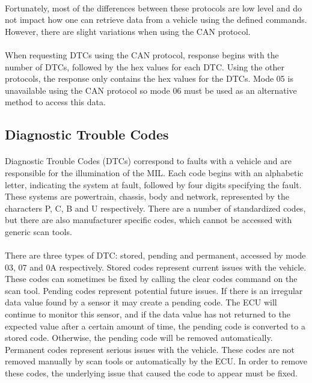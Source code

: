 {		\paragraph{}{
		Fortunately, most of the differences between these protocols are low level and do not impact how one can retrieve data from a vehicle using the defined commands. However, there are slight variations when using the CAN protocol.
		}
		\paragraph{}{
		 When requesting DTCs using the CAN protocol, response begins with the number of DTCs, followed by the hex values for each DTC. Using the other protocols, the response only contains the hex values for the DTCs. Mode 05 is unavailable using the CAN protocol so mode 06 must be used as an alternative method to access this data.
		}	
	}
	\subsection{Diagnostic Trouble Codes}{
		\paragraph{}{
		Diagnostic Trouble Codes (DTCs) correspond to faults with a vehicle and are responsible for the illumination of the MIL. Each code begins with an alphabetic letter, indicating the system at fault, followed by four digits specifying the fault. These systems are powertrain, chassis, body and network, represented by the characters P, C, B and U respectively. There are a number of standardized codes, but there are also manufacturer specific codes, which cannot be accessed with generic scan tools.
		}
		\paragraph{}{
		There are three types of DTC: stored, pending and permanent, accessed by mode 03, 07 and 0A respectively. Stored codes represent current issues with the vehicle. These codes can sometimes be fixed by calling the clear codes command on the scan tool. Pending codes represent potential future issues. If there is an irregular data value found by a sensor it may create a pending code. The ECU will continue to monitor this sensor, and if the data value has not returned to the expected value after a certain amount of time, the pending code is converted to a stored code. Otherwise, the pending code will be removed automatically. Permanent codes represent serious issues with the vehicle. These codes are not removed manually by scan tools or automatically by the ECU. In order to remove these codes, the underlying issue that caused the code to appear must be fixed.
		}			
	}
	\label{ssec:DTC}
